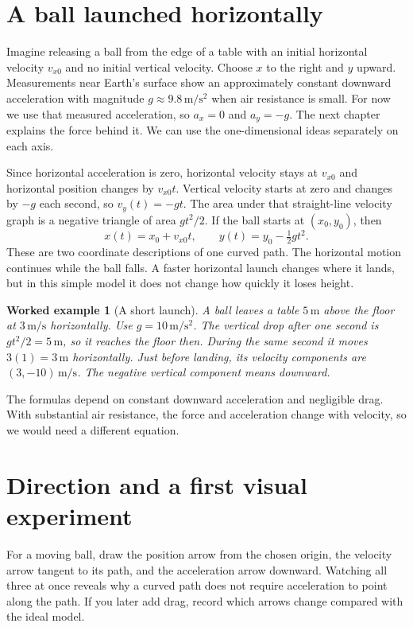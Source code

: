 \documentclass[11pt,oneside]{book}
\theoremstyle{reviewstyle}
\newtheorem{example}{Worked example}[chapter]
\begin{document}
\section{A ball launched horizontally}
Imagine releasing a ball from the edge of a table with an initial horizontal velocity $v_{x0}$ and no initial vertical velocity. Choose $x$ to the right and $y$ upward. Measurements near Earth's surface show an approximately constant downward acceleration with magnitude $g\approx9.8\,\mathrm{m/s^2}$ when air resistance is small. For now we use that measured acceleration, so $a_x=0$ and $a_y=-g$. The next chapter explains the force behind it. We can use the one-dimensional ideas separately on each axis.

Since horizontal acceleration is zero, horizontal velocity stays at $v_{x0}$ and horizontal position changes by $v_{x0}t$. Vertical velocity starts at zero and changes by $-g$ each second, so $v_y(t)=-gt$. The area under that straight-line velocity graph is a negative triangle of area $gt^2/2$. If the ball starts at $(x_0,y_0)$, then
\begin{equation}
x(t)=x_0+v_{x0}t,\qquad
y(t)=y_0-\tfrac12gt^2.
\end{equation}
These are two coordinate descriptions of one curved path. The horizontal motion continues while the ball falls. A faster horizontal launch changes where it lands, but in this simple model it does not change how quickly it loses height.

\begin{example}[A short launch]
A ball leaves a table $5\,\mathrm m$ above the floor at $3\,\mathrm{m/s}$ horizontally. Use $g=10\,\mathrm{m/s^2}$. The vertical drop after one second is $gt^2/2=5\,\mathrm m$, so it reaches the floor then. During the same second it moves $3(1)=3\,\mathrm m$ horizontally. Just before landing, its velocity components are $(3,-10)\,\mathrm{m/s}$. The negative vertical component means downward.
\end{example}

The formulas depend on constant downward acceleration and negligible drag. With substantial air resistance, the force and acceleration change with velocity, so we would need a different equation.

\section{Direction and a first visual experiment}
For a moving ball, draw the position arrow from the chosen origin, the velocity arrow tangent to its path, and the acceleration arrow downward. Watching all three at once reveals why a curved path does not require acceleration to point along the path. If you later add drag, record which arrows change compared with the ideal model.
\end{document}
